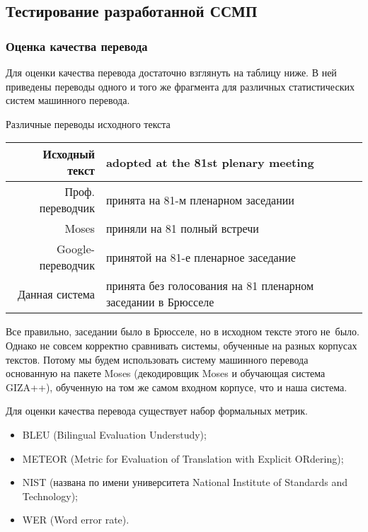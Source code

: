 
\subsection{Тестирование разработанной ССМП}

\subsubsection{Оценка качества перевода}

Для оценки качества перевода достаточно взглянуть на таблицу ниже.
В ней приведены переводы одного и того же фрагмента для различных 
статистических систем машинного перевода.

\begin{dtable}{Различные переводы исходного текста}
		\begin{tabular}{|r|p{10cm}|}
			\hline  Исходный текст 		& adopted at the 81st plenary meeting \\ 
			\hline  Проф. переводчик 	& принята на 81-м пленарном заседании \\ 
			\hline  Moses 				& приняли на 81 полный встречи \\ 
			\hline  Google-переводчик 	& принятой на 81-е пленарное заседание \\ 
			\hline  Данная система 		& принята без голосования на 81 пленарном заседании в Брюсселе \\ 
			\hline 
	\end{tabular} 
\end{dtable}

Все правильно, заседании было в Брюсселе, но в исходном тексте этого 
не~было. Однако не совсем корректно сравнивать системы, обученные на разных
корпусах текстов. Потому мы будем использовать систему машинного перевода
основанную на пакете Moses (декодировщик Moses и обучающая система GIZA++),
обученную на том же самом входном корпусе, что и наша система.

Для оценки качества перевода существует набор формальных метрик.
\begin{itemize}
	\item BLEU (Bilingual Evaluation Understudy);
	\item METEOR (Metric for Evaluation of Translation with Explicit ORdering);
	\item NIST (названа по имени университета National Institute of Standards and Technology);
	\item WER (Word error rate).
\end{itemize}

